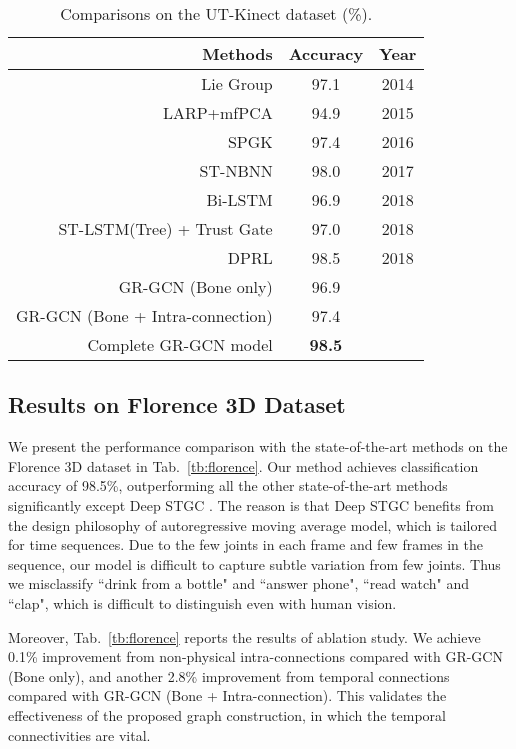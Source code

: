 \documentclass[conference]{IEEEtran}
\begin{document}
\begin{table}
  \centering
  \caption{Comparisons on the UT-Kinect dataset (\%).}
  \label{tb:ut}
  \begin{tabular}{rcc}
    \hline
     \textbf{Methods} & \textbf{Accuracy} & \textbf{Year} \\
    \hline
    Lie Group \cite{vemulapalli14} & 97.1 & 2014 \\
    LARP+mfPCA \cite{Rushil_2015_CVPR} & 94.9 & 2015 \\
    SPGK \cite{Wang16eccv} & 97.4 & 2016 \\
    ST-NBNN \cite{Weng17cvpr} & 98.0 & 2017 \\
    Bi-LSTM \cite{Tanfous_CVPR_2018} & 96.9 & 2018 \\
    ST-LSTM(Tree) + Trust Gate \cite{Liu_2018_TPAMI} & 97.0 & 2018 \\
    DPRL \cite{Tang_2018_CVPR}  & 98.5 & 2018 \\
    \hline
    GR-GCN (Bone only) & 96.9 &  \\
    GR-GCN (Bone + Intra-connection) & 97.4 & \\
    Complete GR-GCN model & \textbf{98.5} & \\
    \hline
  \end{tabular}
\end{table}

\subsection{Results on Florence 3D Dataset}

We present the performance comparison with the state-of-the-art methods on the Florence 3D dataset in Tab.~\ref{tb:florence}. Our method achieves classification accuracy of 98.5\%, outperforming all the other state-of-the-art methods significantly except Deep STGC \cite{li18spatio}. The reason is that Deep STGC benefits from the design philosophy of autoregressive moving average model, which is tailored for time sequences. Due to the few joints in each frame and few frames in the sequence, our model is difficult to capture subtle variation from few joints. Thus we misclassify ``drink from a bottle" and ``answer phone", ``read watch" and ``clap", which is difficult to distinguish even with human vision.

Moreover, Tab.~\ref{tb:florence} reports the results of ablation study. We achieve 0.1\% improvement from non-physical intra-connections compared with GR-GCN (Bone only), and another 2.8\% improvement from temporal connections compared with GR-GCN (Bone + Intra-connection). This validates the effectiveness of the proposed graph construction, in which the temporal connectivities are vital. 
\end{document}
